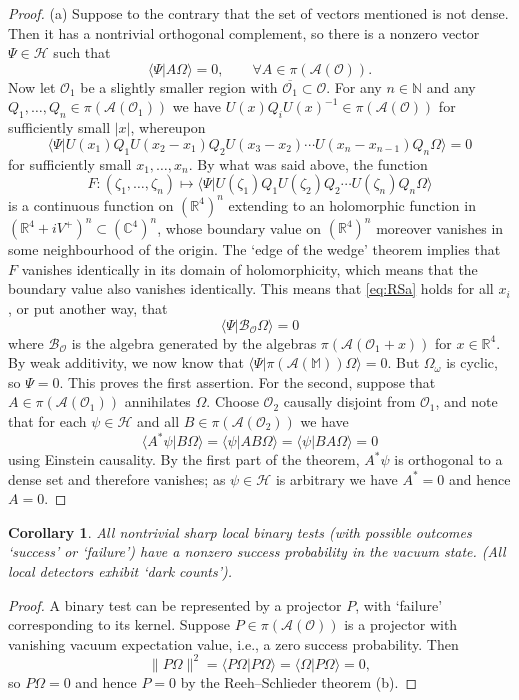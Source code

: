 \documentclass[12pt]{article}
\newcommand{\1}{\mathds{1}}                         %
\newcommand{\NN}{\mathbb{N}}          %
\newcommand{\RR}{\mathbb{R}}           %
\newcommand{\CC}{\mathbb{C}}           %
\newcommand{\Ocal}{\mathcal{O}}
\newcommand{\MM}{\mathbb{M}}
\newcommand{\HH}{{\mathcal{H}}}
\newcommand{\Ac}{{\mathcal{A}}}
\newcommand{\Bc}{{\mathcal{B}}}
\newcommand{\ip}[2]{\langle #1|#2\rangle}
\newtheorem{corollary}[theorem]{Corollary}
\begin{document}
\begin{proof} (a) Suppose to the contrary that the set of vectors mentioned is not dense. Then it has a nontrivial orthogonal complement, so there is a nonzero vector $\Psi\in\HH$ such that 
\[
\ip{\Psi}{A\Omega} = 0,\qquad \forall A\in\pi(\Ac(\Ocal)).
\]
Now let $\Ocal_1$ be a slightly smaller region with $\overline{\Ocal_1}\subset \Ocal$. For any $n\in\NN$ and any $Q_1,\ldots,Q_n\in\pi(\Ac(\Ocal_1))$ we have $U(x)Q_i U(x)^{-1}\in\pi(\Ac(\Ocal))$ for sufficiently small $|x|$, whereupon
\begin{equation}\label{eq:RSa}
\ip{\Psi}{U(x_1)Q_1 U(x_2-x_1) Q_2 U(x_3-x_2)\cdots U(x_n-x_{n-1})Q_n\Omega} = 0
\end{equation}
for sufficiently small $x_1,\ldots,x_n$. By what was said above, the function
\[
F: (\zeta_1,\ldots,\zeta_n)\mapsto \ip{\Psi}{U(\zeta_1)Q_1 U(\zeta_2) Q_2\cdots U(\zeta_n)Q_n\Omega} 
\]
is a continuous function on $(\RR^4)^n$ extending to an holomorphic function in $(\RR^4+iV^+)^n\subset (\CC^4)^n$, whose boundary value on $(\RR^4)^n$ moreover vanishes in some neighbourhood of the origin. The `edge of the wedge' theorem \cite{StreaterWightman,Vladimirov} implies that $F$ vanishes identically in its domain of holomorphicity, which means that the boundary value also vanishes identically. This means that \eqref{eq:RSa} holds for all $x_i$, or put another way, that
\[
\ip{\Psi}{\Bc_\Ocal\Omega}=0
\]
where $\Bc_\Ocal$ is the algebra generated by the algebras $\pi(\Ac(\Ocal_1+x))$ for $x\in\RR^4$. 
By weak additivity, we now know that $\ip{\Psi}{\pi(\Ac(\MM))\Omega} = 0$. But $\Omega_\omega$ is cyclic, so $\Psi=0$. This proves the first assertion. For the second, suppose that $A\in\pi(\Ac(\Ocal_1))$ annihilates $\Omega$. Choose $\Ocal_2$ causally disjoint from $\Ocal_1$, and note that for each $\psi\in\HH$ and all $B\in\pi(\Ac(\Ocal_2))$ we have
\[
\ip{A^*\psi}{B\Omega} = \ip{\psi}{AB\Omega} = \ip{\psi}{BA\Omega} = 0
\]
using Einstein causality. By the first part of the theorem, $A^*\psi$ is orthogonal to a dense set and therefore vanishes; as $\psi\in\HH$ is arbitrary we have $A^*=0$ and hence $A=0$. 
\end{proof}

\begin{corollary} 
	All nontrivial sharp local binary tests (with possible outcomes `success' or `failure') have a nonzero success probability in the vacuum state. (All local detectors exhibit `dark counts'). 
\end{corollary}
\begin{proof}
	A binary test can be represented by a projector $P$, with `failure' corresponding to its kernel. Suppose $P\in\pi(\Ac(\Ocal))$ is a projector with vanishing vacuum expectation value, i.e., a zero success probability. Then 
	\[
	\|P\Omega\|^2=  \ip{P\Omega}{P\Omega} = \ip{\Omega}{P\Omega} = 0,
	\]
	so
	$P\Omega=0$ and hence $P=0$ by the Reeh--Schlieder theorem (b). 
\end{proof}
\end{document}
